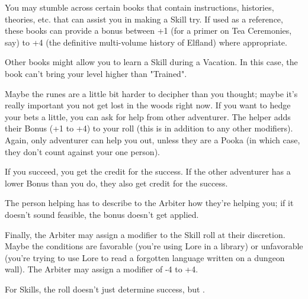 {   

   You may stumble across certain books that contain instructions, histories, theories, etc. that can assist you in making a Skill try.  If used as a reference, these books can provide a bonus between +1 (for a primer on Tea Ceremonies, say) to +4 (the definitive multi-volume history of Elfland) where appropriate. 

   Other books might allow you to learn a Skill during a Vacation.  In this case, the book can't bring your level higher than "Trained".



  Maybe the runes are a little bit harder to decipher than you thought; maybe it's really important you not get lost in the woods right now.  If you want to hedge your bets a little, you can ask for help from  other adventurer.  The helper adds their Bonus (+1 to +4) to your roll (this is in addition to any other modifiers).  Again, only  adventurer can help you out, unless they are a Pooka (in which case, they don't count against your one person).

  If you succeed, you get the credit for the success.  If the other adventurer has a lower Bonus than you do, they also get credit for the success.


  The person helping has to describe to the Arbiter how they're helping you; if it doesn't sound feasible, the bonus doesn't get applied.

  Finally, the Arbiter may assign a modifier to the Skill roll at their discretion.  Maybe the conditions are favorable (you're using Lore in a library) or unfavorable (you're trying to use Lore to read a forgotten language written on a dungeon wall).  The Arbiter may assign a modifier of -4 to +4.



  For Skills, the \RO roll doesn't just determine success, but .  

}
